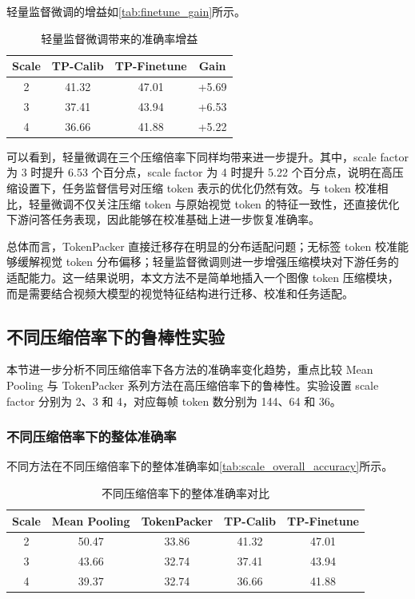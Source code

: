 轻量监督微调的增益如\autoref{tab:finetune_gain}所示。

\begin{table}[!htbp]
    \centering
    \caption{\label{tab:finetune_gain}轻量监督微调带来的准确率增益}
    \begin{tabular}{c c c c}
        \toprule
        Scale & TP-Calib & TP-Finetune & Gain \\
        \midrule
        2 & 41.32 & 47.01 & +5.69 \\
        3 & 37.41 & 43.94 & +6.53 \\
        4 & 36.66 & 41.88 & +5.22 \\
        \bottomrule
    \end{tabular}
\end{table}

可以看到，轻量微调在三个压缩倍率下同样均带来进一步提升。其中，scale factor 为 3 时提升 6.53 个百分点，scale factor 为 4 时提升 5.22 个百分点，说明在高压缩设置下，任务监督信号对压缩 token 表示的优化仍然有效。与 token 校准相比，轻量微调不仅关注压缩 token 与原始视觉 token 的特征一致性，还直接优化下游问答任务表现，因此能够在校准基础上进一步恢复准确率。

总体而言，TokenPacker 直接迁移存在明显的分布适配问题；无标签 token 校准能够缓解视觉 token 分布偏移；轻量监督微调则进一步增强压缩模块对下游任务的适配能力。这一结果说明，本文方法不是简单地插入一个图像 token 压缩模块，而是需要结合视频大模型的视觉特征结构进行迁移、校准和任务适配。

\subsection{不同压缩倍率下的鲁棒性实验}

本节进一步分析不同压缩倍率下各方法的准确率变化趋势，重点比较 Mean Pooling 与 TokenPacker 系列方法在高压缩倍率下的鲁棒性。实验设置 scale factor 分别为 2、3 和 4，对应每帧 token 数分别为 144、64 和 36。

\subsubsection{不同压缩倍率下的整体准确率}

不同方法在不同压缩倍率下的整体准确率如\autoref{tab:scale_overall_accuracy}所示。

\begin{table}[!htbp]
    \centering
    \caption{\label{tab:scale_overall_accuracy}不同压缩倍率下的整体准确率对比}
    \begin{tabular}{c c c c c}
        \toprule
        Scale & Mean Pooling & TokenPacker & TP-Calib & TP-Finetune \\
        \midrule
        2 & 50.47 & 33.86 & 41.32 & 47.01 \\
        3 & 43.66 & 32.74 & 37.41 & 43.94 \\
        4 & 39.37 & 32.74 & 36.66 & 41.88 \\
        \bottomrule
    \end{tabular}
\end{table}

